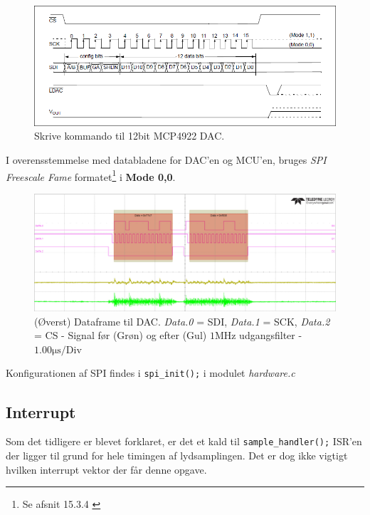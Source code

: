 \begin{figure}[h!]
	\centering
	\includegraphics[width=.8\textwidth]{billeder/dac12bit_writecmd.png}
	\caption{Skrive kommando til 12bit MCP4922 DAC.\cite[s. 25]{mcp4922}}
	\label{fig:dac12bit_writecmd}
\end{figure}

I overensstemmelse med databladene for DAC'en og MCU'en, bruges \emph{SPI Freescale Fame} formatet\footnote{Se afsnit 15.3.4 \cite[s. 954]{tm4c123gh6pm}} i \textbf{Mode 0,0}.

\begin{figure}[h!]
	\centering
	\includegraphics[width=\textwidth]{billeder/dac_dataframe.png}
	\caption{(Øverst) Dataframe til DAC. \textit{Data.0} = SDI, \textit{Data.1} = SCK, \textit{Data.2} = CS - Signal før (Grøn) og efter (Gul)  $1\si{\mega\hertz}$ udgangsfilter - $1.00\si{\micro\second}\text{/Div}$}
	\label{fig:dac_dataframe}
\end{figure}

Konfigurationen af SPI findes i \texttt{spi\_init();} i modulet \textit{hardware.c}  

\FloatBlock

\subsection{Interrupt}\label{subsec:interrupt}
Som det tidligere er blevet forklaret, er det et kald til \texttt{sample\_handler();} ISR'en der ligger til grund for hele timingen af lydsamplingen.
Det er dog ikke vigtigt hvilken interrupt vektor der får denne opgave.\\

